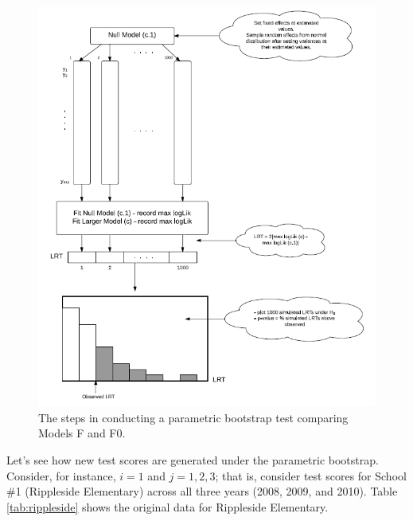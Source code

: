 \documentclass[
]{krantz}
\begin{document}
\begin{figure}
\includegraphics[width=0.8\linewidth]{data/ParametricBootstrapDiagram} \caption{The steps in conducting a parametric bootstrap test comparing Models F and F0.}\label{fig:parabootdiagram}
\end{figure}

Let's see how new test scores are generated under the parametric bootstrap. Consider, for instance, \(i=1\) and \(j=1,2,3\); that is, consider test scores for School \#1 (Rippleside Elementary) across all three years (2008, 2009, and 2010). Table \ref{tab:rippleside} shows the original data for Rippleside Elementary.

\begin{table}

\caption{\label{tab:rippleside}Original data for Rippleside Elementary (School 1)}
\centering
{}
\end{table}
\end{document}
